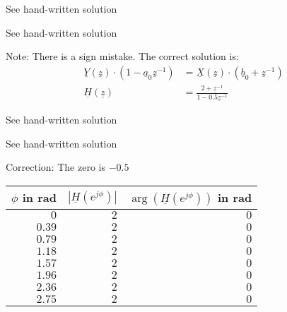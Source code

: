 \begin{solution}
	\begin{tasks}
		\task
		See hand-written solution
		
		\task
		See hand-written solution
		
		Note: There is a sign mistake. The correct solution is:
		\begin{equation*}
			\begin{split}
				\underline{Y} \left(\underline{z}\right) \cdot \left(1 - \underline{a}_0 \underline{z}^{-1}\right) &= \underline{X} \left(\underline{z}\right) \cdot \left(\underline{b}_0 + \underline{z}^{-1}\right) \\
				\underline{H} \left(\underline{z}\right) &= \frac{2 + \underline{z}^{-1}}{1 - 0.5 \underline{z}^{-1}}
			\end{split}
		\end{equation*}
		
		\task
		See hand-written solution
		
		\task
		See hand-written solution
		
		Correction: The zero is $-0.5$
		
		\task
		\begin{table}[H]
			\centering
			\begin{tabular}{|r|r|r|}
				\hline
				$\phi$ in \si{rad} & $\left|\underline{H}\left(e^{j\phi}\right)\right|$ & $\arg\left(\underline{H}\left(e^{j\phi}\right)\right)$ in \si{rad} \\
				\hline
				\hline
				$0$ & $2$ & $0$ \\
				\hline
				$0.39$ & $2$ & $0$ \\
				\hline
				$0.79$ & $2$ & $0$ \\
				\hline
				$1.18$ & $2$ & $0$ \\
				\hline
				$1.57$ & $2$ & $0$ \\
				\hline
				$1.96$ & $2$ & $0$ \\
				\hline
				$2.36$ & $2$ & $0$ \\
				\hline
				$2.75$ & $2$ & $0$ \\
				\hline
			\end{tabular}
		\end{table}
	

\end{tasks}
\end{solution}
